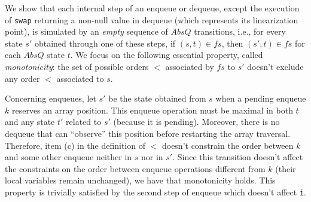 We show that each internal step of an enqueue or dequeue, except the execution of {\tt swap} returning a non-null value in dequeue (which represents its linearization point), is simulated by an \emph{empty} sequence of $AbsQ$ transitions, i.e., for every state $s'$ obtained through one of these steps, if $(s,t)\in\mathit{fs}$, then $(s',t)\in\mathit{fs}$ for each $AbsQ$ state $t$. We focus on the following essential property, called \emph{monotonicity}: the set of possible orders $<$ associated by $\mathit{fs}$ to $s'$ doesn't exclude any order $<$ associated to $s$.

Concerning enqueues, let $s'$ be the state obtained from $s$ when a pending enqueue $k$ reserves an array position. This enqueue operation must be maximal in both $t$ and any state $t'$ related to $s'$ (because it is pending). Moreover, there is no dequeue that can ``observe'' this position before restarting the array traversal. Therefore, item (c) in the definition of $<$ doesn't constrain the order between $k$ and some other enqueue neither in $s$ nor in $s'$. Since this transition doesn't affect the constraints on the order between enqueue operations different from $k$ (their local variables remain unchanged), we have that monotonicity holds. This property is trivially satisfied by the second step of enqueue which doesn't affect {\tt i}.

